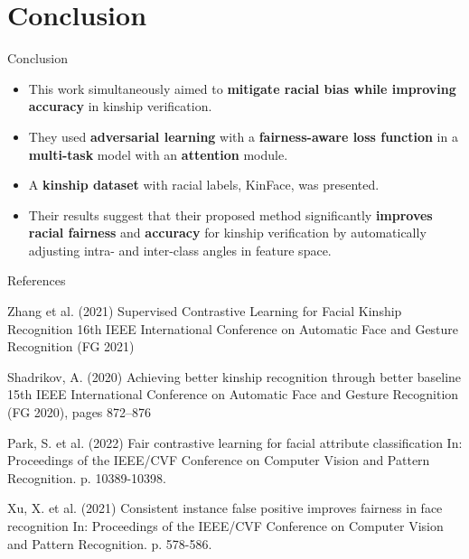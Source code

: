 \documentclass[aspectratio=169,xcolor=dvipsnames]{beamer}
\begin{document}
\section{Conclusion}
\begin{frame}{Conclusion}
    \begin{itemize}
        \item This work simultaneously aimed to \textbf{mitigate racial bias while improving accuracy} in kinship verification. 
        \item They used \textbf{adversarial learning} with a \textbf{fairness-aware loss function} in a \textbf{multi-task} model with an \textbf{attention} module. 
        \item A \textbf{kinship dataset} with racial labels, KinFace, was presented. 
        \item Their results suggest that their proposed method significantly \textbf{improves racial fairness} and \textbf{accuracy} for kinship verification by automatically adjusting intra- and inter-class angles in feature space.
    \end{itemize}
\end{frame}

\begin{frame}{References}
    \footnotesize{
        \begin{thebibliography}{99}
             Zhang et al. (2021)
            \newblock Supervised Contrastive Learning for Facial Kinship Recognition
             16th IEEE International Conference on Automatic Face and Gesture Recognition (FG 2021)
            
             Shadrikov, A. (2020)
            \newblock Achieving better kinship recognition through better baseline
             15th IEEE International Conference on Automatic Face and Gesture Recognition (FG 2020), pages 872–876
    
             Park, S. et al. (2022)
            \newblock Fair contrastive learning for facial attribute classification
            \newblock In: Proceedings of the IEEE/CVF Conference on Computer Vision and Pattern Recognition. p. 10389-10398.

             Xu, X. et al. (2021)
            \newblock Consistent instance false positive improves fairness in face recognition
            \newblock In: Proceedings of the IEEE/CVF Conference on Computer Vision and Pattern Recognition. p. 578-586.
        \end{thebibliography}
    }
\end{frame}
\end{document}

